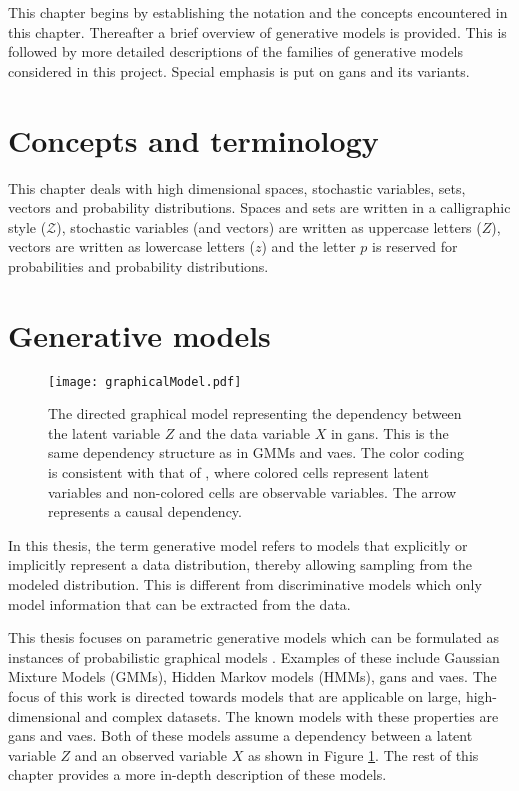This chapter begins by establishing the notation and the concepts encountered in this chapter. Thereafter a brief overview of generative models is provided. This is followed by more detailed descriptions of the families of generative models considered in this project. Special emphasis is put on \acrlong{gans} and its variants.

\section{Concepts and terminology}
This chapter deals with high dimensional spaces, stochastic variables, sets, vectors and probability distributions. Spaces and sets are written in a calligraphic style ($\mathcal{Z}$), stochastic variables (and vectors) are written as uppercase letters ($Z$), vectors are written as lowercase letters ($z$) and the letter $p$ is reserved for probabilities and probability distributions. 

\section{Generative models}
\begin{figure}[t]
    \centering
    \texttt{[image: graphicalModel.pdf]}
    \caption{The directed graphical model representing the dependency between the latent variable $Z$ and the data variable $X$ in \acrshort{gans}. This is the same dependency structure as in GMMs and \acrshort{vaes}. The color coding is consistent with that of \textcite{christopher2016pattern}, where colored cells represent latent variables and non-colored cells are observable variables. The arrow represents a causal dependency.}
    \label{fig:GANgraph}
\end{figure}
In this thesis, the term generative model refers to models that explicitly or implicitly represent a data distribution, thereby allowing sampling from the modeled distribution. This is different from discriminative models which only model information that can be extracted from the data. 

This thesis focuses on parametric generative models which can be formulated as instances of probabilistic graphical models \parencite{christopher2016pattern}. Examples of these include Gaussian Mixture Models (GMMs), Hidden Markov models (HMMs), \acrfull{gans} and \acrfull{vaes}. The focus of this work is directed towards models that are applicable on large, high-dimensional and complex datasets. The known models with these properties are  \acrshort{gans} and \acrshort{vaes}. Both of these models assume a dependency between a latent variable $Z$ and an observed variable $X$ as shown in Figure \ref{fig:GANgraph}. The rest of this chapter provides a more in-depth description of these models. 

